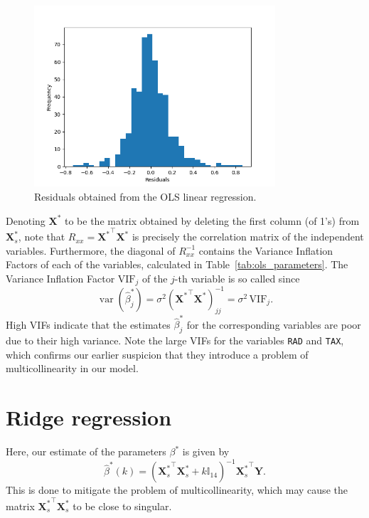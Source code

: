 \documentclass[10pt]{article}
\renewcommand{\vec}{\bm}
\newcounter{prob}
\begin{document}
    \begin{figure}[H]
    \begin{center}
        \includegraphics[width=0.8\textwidth]{residuals.png}
    \end{center}
    \caption{Residuals obtained from the OLS linear regression.}
    \label{fig:ols_residuals}
    \end{figure}

    Denoting $\vec{X}^*$ to be the matrix obtained by deleting the first column (of
    1's) from $\vec{X}_s^*$, note that $R_{xx} = {\vec{X}^*}^\top \vec{X}^*$ is
    precisely the correlation matrix of the independent variables. Furthermore, the
    diagonal of $R_{xx}^{-1}$ contains the Variance Inflation Factors of each of the
    variables, calculated in Table~\ref{tab:ols_parameters}. The Variance Inflation
    Factor $\text{VIF}_j$ of the $j$-th variable is so called since \[
        \operatorname{var}(\hat{\beta}_j^*) = \sigma^2 ({\vec{X}^*}^\top
        \vec{X}^*)^{-1}_{jj} = \sigma^2\, \text{VIF}_j.
    \] High VIFs indicate that the estimates $\hat{\beta}_j^*$ for the corresponding
    variables are poor due to their high variance. Note the large VIFs for the
    variables \texttt{RAD} and \texttt{TAX}, which confirms our earlier suspicion
    that they introduce a problem of multicollinearity in our model.


    \section{Ridge regression}

    Here, our estimate of the parameters $\beta^*$ is given by \[
        \hat{\beta}^*(k) = ({\vec{X}_s^*}^\top\vec{X}_s^* +
        k\mathbb{I}_{14})^{-1}{\vec{X}_s^*}^\top \vec{Y}.
    \] This is done to mitigate the problem of multicollinearity, which may cause the
    matrix ${\vec{X}_s^*}^\top \vec{X}_s^*$ to be close to singular.
\end{document}
